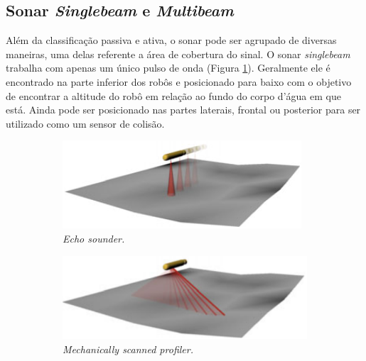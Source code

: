 \subsection{Sonar \textit{Singlebeam} e \textit{Multibeam}}
\label{sec:single-multibeam}
Além da classificação passiva e ativa, o sonar pode ser agrupado de diversas maneiras, uma delas referente a área de cobertura do sinal.
O sonar \textit{singlebeam} trabalha com apenas um único pulso de onda (Figura \ref{fig:echo-sounder}). Geralmente ele é encontrado na parte inferior dos robôs e posicionado para baixo com o objetivo de encontrar a altitude do robô em relação ao fundo do corpo d'água em que está. Ainda pode ser posicionado nas partes laterais, frontal ou posterior para ser utilizado como um sensor de colisão.

\begin{figure}[H]
    \centering
    \caption{Diferentes modelos de sonares.}
    \label{fig:beams}
    \begin{subfigure}[t]{0.4\textwidth}
        \includegraphics[width=\textwidth]{dados/figuras/singlebeam.png}
        \caption{\textit{Echo sounder.}}
        \label{fig:echo-sounder}
    \end{subfigure}
    \begin{subfigure}[t]{0.4\textwidth}
        \includegraphics[width=\textwidth]{dados/figuras/mec-scan-profiling.png}
        \caption{\textit{Mechanically scanned profiler.}}
        \label{fig:mec-scan-prof}
    \end{subfigure}
    \begin{subfigure}[t]{0.4\textwidth}

\end{subfigure}
\end{figure}
